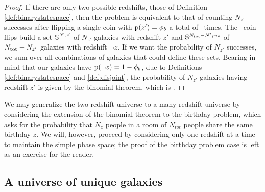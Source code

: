 \begin{proof}
If there are only two possible redshifts, those of Definition \ref{def:binarystatespace}, then the problem is equivalent to that of counting $N_{z'}$ successes after flipping a single coin with $\mathrm{p}(z') = \phi_{b}$ a total of \ntot\ times.
The \ntot\ coin flips build a set $\mathbb{S}^{N'; z'}$ of $N_{z'}$ galaxies with redshift $z'$ and $\mathbb{S}^{N_{\mathrm{tot}} - N'; \lnot z}$ of $N_{\mathrm{tot}} - N_{z'}$ galaxies with redshift $\lnot z$.
If we want the probability of $N_{z'}$ successes, we sum over all combinations of galaxies that could define these sets.
Bearing in mind that our galaxies have $\mathrm{p}(\lnot z) = 1 - \phi_{b}$, due to Definitions \ref{def:binarystatespace} and \ref{def:disjoint}, the probability of $N_{z'}$ galaxies having redshift $z'$ is given by the binomial theorem, which is .
\end{proof}

We may generalize the two-redshift universe to a many-redshift universe by considering the extension of the binomial theorem to the birthday problem, which asks for the probability that $N_{z}$ people in a room of $N_{tot}$ people share the same birthday $z$.
We will, however, proceed by considering only one redshift at a time to maintain the simple phase space; the proof of the birthday problem case is left as an exercise for the reader.

\subsection{A universe of unique galaxies}

